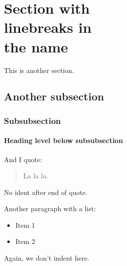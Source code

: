 \section[Optional table of contents heading]{Section with\\linebreaks in\\the
name}

This is another section.

\subsection{Another subsection}

\subsubsection{Subsubsection}

\paragraph{Heading level below subsubsection}
\label{sec:paragraph}

And I quote: 
%
\begin{quote}
La la la.
\end{quote}
%
\noindent No ident after end of quote.  

Another paragraph with a list:
%
\begin{itemize}
%  
\item Item 1
%
\item Item 2
%
\end{itemize}
%
\noindent Again, we don't indent here.